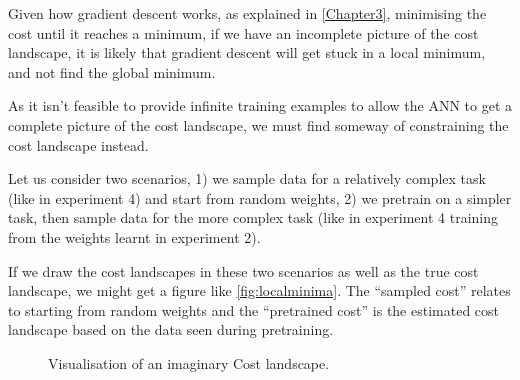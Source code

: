 Given how gradient descent works, as explained in \autoref{Chapter3},  minimising the cost until it reaches a minimum, if we have an incomplete picture of the cost landscape, it is likely that gradient descent will get stuck in a local minimum, and not find the global minimum.

As it isn't feasible to provide infinite training examples to allow the \ac{ANN} to get a complete picture of the cost landscape, we must find someway of constraining the cost landscape instead.

Let us consider two scenarios, 1) we sample data for a relatively complex task (like in experiment 4) and start from random weights, 2) we pretrain on a simpler task, then sample data for the more complex task (like in experiment 4 training from the weights learnt in experiment 2).

If we draw the cost landscapes in these two scenarios as well as the true cost landscape, we might get a figure like \autoref{fig:localminima}. The ``sampled cost'' relates to starting from random weights and the ``pretrained cost'' is the estimated cost landscape based on the data seen during pretraining.
\begin{figure}[h!]
\begin{center}
\caption{Visualisation of an imaginary Cost landscape.}
\label{fig:localminima}
\end{center}
\end{figure}

